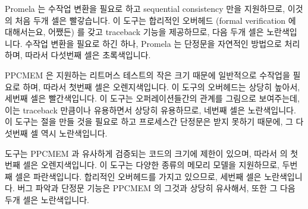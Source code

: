 Promela 는 수작업 변환을 필요로 하고 sequential consistency 만을 지원하므로,
이것의 처음 두개 셀은 빨갛습니다.
이 도구는 합리적인 오버헤드 (formal verification 에 대해서는요, 어쨌든) 를 갖고
traceback 기능을 제공하므로, 다음 두개 셀은 노란색입니다.
수작업 변환을 필요로 하긴 하나, Promela 는 단정문을 자연적인 방법으로 처리하며,
따라서 다섯번째 셀은 초록색입니다.
\iffalse

Table~\ref{tab:future:Formal Regression Scorecard}
shows a rough-and-ready scorecard for the formal-verification tools
covered in this chapter.
Shorter wavelengths are better than longer wavelengths.

Promela requires hand translation and supports only sequential
consistency, so its first two cells are red.
It has reasonable overhead (for formal verification, anyway)
and provides a traceback, so its next two cells are yellow.
Despite requiring hand translation, Promela handles assertions
in a natural way, so its fifth cell is green.
\fi

PPCMEM 은 지원하는 리트머스 테스트의 작은 크기 때문에 일반적으로 수작업을
필요로 하며, 따라서 첫번째 셀은 오렌지색입니다.
이 도구의 오버헤드는 상당히 높아서, 세번째 셀은 빨간색입니다.
이 도구는 오퍼레이션들간의 관계를 그림으로 보여주는데, 이는 traceback 만큼이나
유용하면서 상당히 유용하므로, 네번째 셀은 노란색입니다.
이 도구는  절을 만들 것을 필요로 하고 프로세스간 단정문은 받지
못하기 때문에, 그 다섯번째 셀 역시 노란색입니다.

 도구는 PPCMEM 과 유사하게 검증되는 코드의 크기에 제한이 있으며,
따라서  의 첫번째 셀은 오렌지색입니다.
이 도구는 다양한 종류의 메모리 모델을 지원하므로, 두번째 셀은 파란색입니다.
합리적인 오버헤드를 가지고 있으므로, 세번째 셀은 노란색입니다.
버그 파악과 단정문 기능은 PPCMEM 의 그것과 상당히 유사해서,  또한 그
다음 두개 셀은 노란색입니다.
\iffalse

PPCMEM usually requires hand translation due to the small size of litmus
tests that it supports, so its first cell is orange.
It handles several memory models, so its second cell is green.
Its overhead is quite high, so its third cell is red.
It provides a graphical display of relations among operations, which
is not as helpful as a traceback, but is still quite useful, so its
fourth cell is yellow.
It requires constructing an \co{exists} clause and cannot take
intra-process assertions, so its fifth cell is also yellow.

The \co{herd} tool has size restrictions similar to those of PPCMEM,
so \co{herd}'s first cell is also orange.
It supports a wide variety of memory models, so its second cell is blue.
It has reasonable overhead, so its third cell is yellow.
Its bug-location and assertion capabilities are quite similar to those
of PPCMEM, so \co{herd} also gets yellow for the next two cells.
\fi

